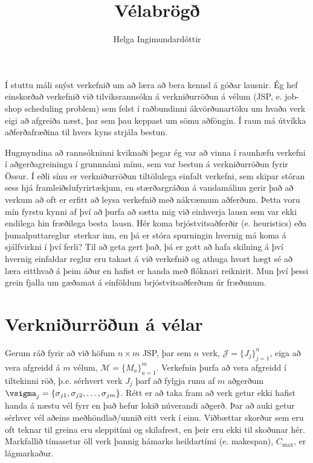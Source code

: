 \documentclass[10pt,a4paper]{article}
\title{Vélabrögð} %
\author{Helga Ingimundardóttir}
\begin{document}
\maketitle


Í stuttu máli snýst verkefnið um að læra að bera kennsl á góðar lausnir. 
Ég hef einskorðað verkefnið við tilviksrannsókn á verkniðurröðun á vélum (JSP, 
e. job-shop scheduling problem) 
sem felst í raðbundinni ákvörðunartöku um hvaða verk eigi að afgreiða næst, þar 
sem þau keppast um sömu aðföngin.
Í raun má útvíkka aðferðafræðina til hvers kyns strjála bestun. 

Hugmyndina að rannsókninni kviknaði þegar ég var að vinna í raunhæfu verkefni í 
aðgerðagreiningu í grunnnámi mínu, sem var bestun á verkniðurröðun fyrir 
Össur. Í eðli sínu er verkniðurröðun tiltölulega einfalt verkefni, sem skipar 
stóran sess hjá framleiðslufyrirtækjum, en stærðargráðan á vandamálinu gerir 
það að verkum að oft er erfitt að leysa verkefnið með nákvæmum aðferðum. 
Þetta voru mín fyrstu kynni af því að þurfa að sætta mig við einhverja lausn 
sem var ekki endilega hin fræðilega \glqq besta\grqq\ lausn. 
Hér koma brjóstvitsaðferðir (e. heuristics) eða \glqq þumalputtareglur\grqq\ 
sterkar 
inn, en þá er stóra spurningin hvernig má koma á sjálfvirkni í því ferli? 
Til að geta gert það, þá er gott að hafa skilning á því hvernig einfaldar 
reglur eru takast á við verkefnið og athuga hvort hægt sé að læra eitthvað á 
þeim áður en hafist er handa með flóknari reiknirit. 
Mun því þessi grein fjalla um gæðamat á einföldum brjóstvitsaðferðum úr 
fræðunum. 

\section*{Verkniðurröðun á vélar}
Gerum ráð fyrir að við höfum $n\times m$ JSP, 
þar sem $n$ verk, $\mathcal{J}=\{J_j\}_{j=1}^n$, 
eiga að vera afgreidd á $m$ vélum, $\mathcal{M}=\{M_a\}_{a=1}^m$. 
Verkefnin þurfa að vera afgreidd í tiltekinni röð, þ.e. sérhvert verk $J_j$ 
þarf að fylgja runu af $m$ aðgerðum 
$\vsigma_j=\{\sigma_{j1},\sigma_{j2},\dotsc,\sigma_{jm}\}$. 
Rétt er að taka fram að verk getur ekki hafist handa á næstu vél fyrr en það 
hefur lokið núverandi aðgerð. 
Þar að auki getur sérhver vél aðeins meðhöndlað/unnið eitt verk í einu. 
Viðbættar skorður sem eru oft teknar til greina eru sleppitími og skilafrest, 
en þeir eru ekki til skoðunar hér.
Markfallið tímasetur öll verk þannig hámarks heildartími (e. makespan), 
$C_{\max}$, er lágmarkaður. 
\end{document}
